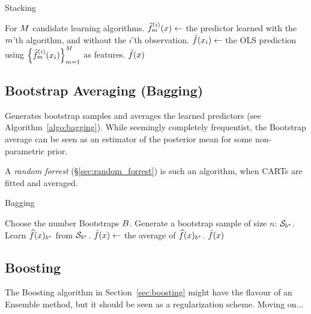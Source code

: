 \begin{algorithm}[H]
\caption{Stacking}
\label{algo:stacking}
\begin{algorithmic}
\State For $M$ candidate learning algorithms.
		\State $\widehat{f}^{(i)}_m(x) \gets$ the predictor learned with the $m$'th algorithm, and without the $i$'th observation.
	\EndFor
	\State $\bar{f}(x_i) \gets$ the OLS prediction using $\left\{  \widehat{f}^{(i)}_m(x_i) \right\}_{m=1}^M$ as features. 
\EndFor
\State \Return $\bar{f}(x)$
\end{algorithmic}
\end{algorithm}







\subsection{Bootstrap Averaging (Bagging)}
\label{sec:bagging}

Generates bootstrap samples and averages the learned predictors (see Algorithm~\ref{algo:bagging}). 
While seemingly completely frequentist, the Bootstrap average can be seen as an estimator of the posterior mean for some non-parametric prior.

A \emph{random forrest} (\S\ref{sec:random_forrest}) is such an algorithm, when CARTs are fitted and averaged.


\begin{algorithm}[H]
\caption{Bagging}
\label{algo:bagging}
\begin{algorithmic}
\State Choose the number Bootstraps $B$.
	\State Generate a bootstrap sample of size $n$: $\mathcal{S}_{b^*}$.
	\State Learn $\widehat{f}(x)_{{b^*}}$ from $\mathcal{S}_{b^*}$.
\EndFor
\State $\bar{f}(x) \gets$ the average of $\widehat{f}(x)_{{b^*}}$.
\State \Return $\bar{f}(x)$
\end{algorithmic}
\end{algorithm}





\subsection{Boosting}
The Boosting algorithm in Section~\ref{sec:boosting} might have the flavour of an Ensemble method, but it should be seen as a regularization scheme. Moving on...

